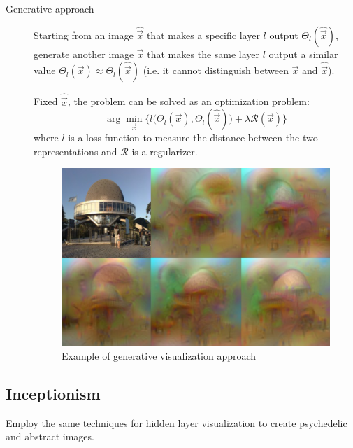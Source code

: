 \begin{description}
    \item[Generative approach]
        Starting from an image $\hat{\vec{x}}$ that makes a specific layer $l$ output $\Theta_l(\hat{\vec{x}})$, 
        generate another image $\vec{x}$ that makes the same layer $l$ output a similar value $\Theta_l(\vec{x}) \approx \Theta_l(\hat{\vec{x}})$
        (i.e. it cannot distinguish between $\vec{x}$ and $\hat{\vec{x}}$).

        Fixed $\hat{\vec{x}}$, the problem can be solved as an optimization problem:
        \[ \arg\min_{\vec{x}} \Big\{ l\big( \Theta_l(\vec{x}), \Theta_l(\hat{\vec{x}}) \big) + \lambda \mathcal{R}(\vec{x}) \Big\} \]
        where $l$ is a loss function to measure the distance between the two representations and 
        $\mathcal{R}$ is a regularizer.

        \begin{figure}[H]
            \centering
            \includegraphics[width=0.6\linewidth]{./img/cnn_visualization_generative.png}
            \caption{Example of generative visualization approach}
        \end{figure}
\end{description}


\subsection{Inceptionism}

Employ the same techniques for hidden layer visualization to create psychedelic and abstract images.

